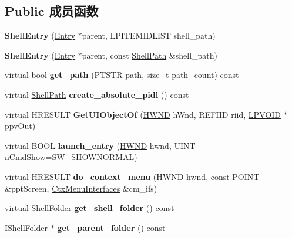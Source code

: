 \subsection*{Public 成员函数}
\begin{DoxyCompactItemize}
\item 
\mbox{\label{struct_shell_entry_af2eda60b996c9ea087d3d87634d2d3cd}} 
{\bfseries Shell\+Entry} (\hyperlink{struct_entry}{Entry} $\ast$parent, L\+P\+I\+T\+E\+M\+I\+D\+L\+I\+ST shell\+\_\+path)
\item 
\mbox{\label{struct_shell_entry_aa862cd94c4255b2b06972920c362ff2a}} 
{\bfseries Shell\+Entry} (\hyperlink{struct_entry}{Entry} $\ast$parent, const \hyperlink{struct_shell_path}{Shell\+Path} \&shell\+\_\+path)
\item 
\mbox{\label{struct_shell_entry_aad52e37cf1650fc8ae5f856c61a3d2ed}} 
virtual bool {\bfseries get\+\_\+path} (P\+T\+S\+TR \hyperlink{structpath}{path}, size\+\_\+t path\+\_\+count) const
\item 
\mbox{\label{struct_shell_entry_a8dd9b3e7e37b07dc40adb8cc529e53f8}} 
virtual \hyperlink{struct_shell_path}{Shell\+Path} {\bfseries create\+\_\+absolute\+\_\+pidl} () const
\item 
\mbox{\label{struct_shell_entry_ab66a6d88195783371cef7b8dc51b90ce}} 
virtual H\+R\+E\+S\+U\+LT {\bfseries Get\+U\+I\+Object\+Of} (\hyperlink{interfacevoid}{H\+W\+ND} h\+Wnd, R\+E\+F\+I\+ID riid, \hyperlink{interfacevoid}{L\+P\+V\+O\+ID} $\ast$ppv\+Out)
\item 
\mbox{\label{struct_shell_entry_ac3db3e8efdfdee25df49a20c35529079}} 
virtual B\+O\+OL {\bfseries launch\+\_\+entry} (\hyperlink{interfacevoid}{H\+W\+ND} hwnd, U\+I\+NT n\+Cmd\+Show=S\+W\+\_\+\+S\+H\+O\+W\+N\+O\+R\+M\+AL)
\item 
\mbox{\label{struct_shell_entry_a1172ae9fa4a3b2b5249971e9ac704de9}} 
virtual H\+R\+E\+S\+U\+LT {\bfseries do\+\_\+context\+\_\+menu} (\hyperlink{interfacevoid}{H\+W\+ND} hwnd, const \hyperlink{structtag_p_o_i_n_t}{P\+O\+I\+NT} \&ppt\+Screen, \hyperlink{struct_ctx_menu_interfaces}{Ctx\+Menu\+Interfaces} \&cm\+\_\+ifs)
\item 
\mbox{\label{struct_shell_entry_ae1c364a4c54ed30849c33991242c59c7}} 
virtual \hyperlink{struct_shell_folder}{Shell\+Folder} {\bfseries get\+\_\+shell\+\_\+folder} () const
\item 
\mbox{\label{struct_shell_entry_a3e7cc01aaed708bbc68b0cd64550bd09}} 
\hyperlink{interface_i_shell_folder}{I\+Shell\+Folder} $\ast$ {\bfseries get\+\_\+parent\+\_\+folder} () const
\end{DoxyCompactItemize}
